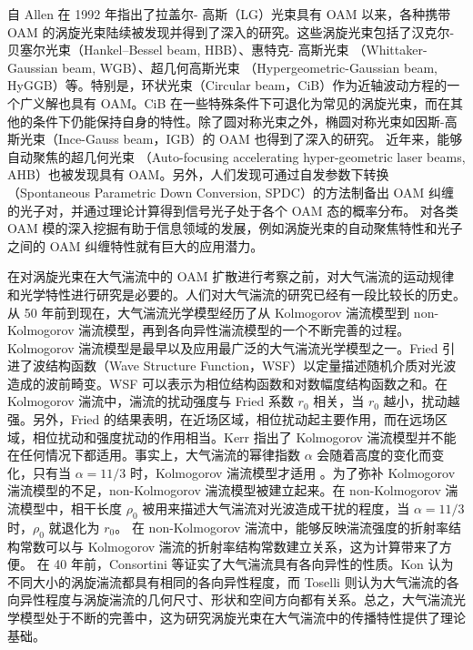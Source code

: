 \documentclass[master]{thesis-uestc}
\begin{document}
自 Allen 在 1992 年指出了拉盖尔- 高斯（LG）光束具有 OAM 以来，各种携带 OAM 的涡旋光束陆续被发现并得到了深入的研究。这些涡旋光束包括了汉克尔-贝塞尔光束（Hankel–Bessel beam, HBB）、惠特克- 高斯光束 （Whittaker-Gaussian beam, WGB）、超几何高斯光束 （Hypergeometric-Gaussian beam, HyGGB）等。特别是，环状光束（Circular beam，CiB）作为近轴波动方程的一个广义解也具有 OAM。CiB 在一些特殊条件下可退化为常见的涡旋光束，而在其他的条件下仍能保持自身的特性。除了圆对称光束之外，椭圆对称光束如因斯-高斯光束（Ince-Gauss beam，IGB）的 OAM 也得到了深入的研究。 近年来，能够自动聚焦的超几何光束 （Auto-focusing accelerating hyper-geometric laser beams, AHB）也被发现具有 OAM。另外，人们发现可通过自发参数下转换 （Spontaneous Parametric Down Conversion, SPDC）的方法制备出 OAM 纠缠的光子对，并通过理论计算得到信号光子处于各个 OAM 态的概率分布。 对各类 OAM 模的深入挖掘有助于信息领域的发展，例如涡旋光束的自动聚焦特性和光子之间的 OAM 纠缠特性就有巨大的应用潜力。

在对涡旋光束在大气湍流中的 OAM 扩散进行考察之前，对大气湍流的运动规律和光学特性进行研究是必要的。人们对大气湍流的研究已经有一段比较长的历史。从 50 年前到现在，大气湍流光学模型经历了从 Kolmogorov 湍流模型到 non-Kolmogorov 湍流模型，再到各向异性湍流模型的一个不断完善的过程。 Kolmogorov 湍流模型是最早以及应用最广泛的大气湍流光学模型之一。Fried 引进了波结构函数（Wave Structure Function，WSF）以定量描述随机介质对光波造成的波前畸变。WSF 可以表示为相位结构函数和对数幅度结构函数之和。在 Kolmogorov 湍流中，湍流的扰动强度与 Fried 系数 $r_0$ 相关，当 $r_0$ 越小，扰动越强。另外，Fried 的结果表明，在近场区域，相位扰动起主要作用，而在远场区域，相位扰动和强度扰动的作用相当。Kerr 指出了 Kolmogorov 湍流模型并不能在任何情况下都适用。事实上，大气湍流的幂律指数 $\alpha$ 会随着高度的变化而变化，只有当 $\alpha=11/3$ 时，Kolmogorov 湍流模型才适用                                 。为了弥补 Kolmogorov 湍流模型的不足，non-Kolmogorov 湍流模型被建立起来。在 non-Kolmogorov 湍流模型中，相干长度 $\rho_0$ 被用来描述大气湍流对光波造成干扰的程度，当 $\alpha=11/3$ 时，$\rho_0$ 就退化为 $r_0$。 在 non-Kolmogorov 湍流中，能够反映湍流强度的折射率结构常数可以与 Kolmogorov 湍流的折射率结构常数建立关系，这为计算带来了方便。 在 40 年前，Consortini 等证实了大气湍流具有各向异性的性质。Kon 认为不同大小的涡旋湍流都具有相同的各向异性程度，而 Toselli 则认为大气湍流的各向异性程度与涡旋湍流的几何尺寸、形状和空间方向都有关系。总之，大气湍流光学模型处于不断的完善中，这为研究涡旋光束在大气湍流中的传播特性提供了理论基础。
\end{document}
